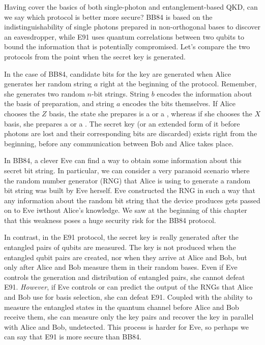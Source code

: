 Having cover the basics of both single-photon and entanglement-based QKD, can we say which protocol is better more secure?
BB84 is based on the indistinguishability of single photons prepared in non-orthogonal bases to discover an eavesdropper, while E91 uses quantum correlations between two qubits to bound the information that is potentially compromised.
Let's compare the two protocols from the point when the secret key is generated.

In the case of BB84, candidate bits for the key are generated when Alice generates her random string $a$ right at the beginning of the protocol.
Remember, she generates two random $n$-bit strings.
String $b$ encodes the information about the basis of preparation, and string $a$ encodes the bits themselves.
If Alice chooses the $Z$ basis, the state she prepares is a  or a , whereas if she chooses the $X$ basis, she prepares a \ket{+} or a \ket{-}.
The secret key (or an extended form of it before photons are lost and their corresponding bits are discarded) exists right from the beginning, before any communication between Bob and Alice takes place.

In BB84, a clever Eve can find a way to obtain some information about this secret bit string.
In particular, we can consider a very paranoid scenario where the random number generator (RNG) that Alice is using to generate a random bit string was built by Eve herself.
Eve constructed the RNG in such a way that any information about the random bit string that the device produces gets passed on to Eve iwthout Alice's knowledge.
We saw at the beginning of this chapter that this weakness poses a huge security risk for the BB84 protocol.

In contrast, in the E91 protocol, the secret key is really generated after the entangled pairs of qubits are measured.
The key is not produced when the entangled qubit pairs are created, nor when they arrive at Alice and Bob, but only after Alice and Bob measure them in their random bases.
Even if Eve controls the generation and distribution of entangled pairs, she cannot defeat E91.
\emph{However}, if Eve controls or can predict the output of the RNGs that Alice and Bob use for basis selection, she can defeat E91.
Coupled with the ability to measure the entangled states in the quantum channel before Alice and Bob receive them, she can measure only the key pairs and recover the key in parallel with Alice and Bob, undetected. This process is harder for Eve, so perhaps we can say that E91 is more secure than BB84.

